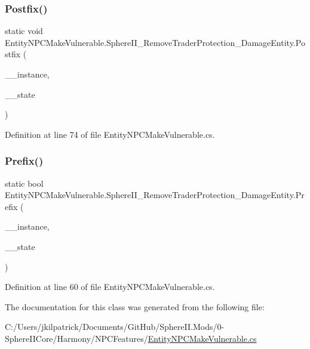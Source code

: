 \subsubsection{\texorpdfstring{Postfix()}{Postfix()}}
{\footnotesize\ttfamily static void Entity\+N\+P\+C\+Make\+Vulnerable.\+Sphere\+I\+I\+\_\+\+Remove\+Trader\+Protection\+\_\+\+Damage\+Entity.\+Postfix (\begin{DoxyParamCaption}\item[{Entity\+N\+PC}]{\+\_\+\+\_\+instance,  }\item[{int}]{\+\_\+\+\_\+state }\end{DoxyParamCaption})\hspace{0.3cm}{\ttfamily [static]}}



Definition at line 74 of file Entity\+N\+P\+C\+Make\+Vulnerable.\+cs.

\mbox{\label{class_entity_n_p_c_make_vulnerable_1_1_sphere_i_i___remove_trader_protection___damage_entity_a65a17f6017e445cb078bdb1e2e76a69b}} 
\subsubsection{\texorpdfstring{Prefix()}{Prefix()}}
{\footnotesize\ttfamily static bool Entity\+N\+P\+C\+Make\+Vulnerable.\+Sphere\+I\+I\+\_\+\+Remove\+Trader\+Protection\+\_\+\+Damage\+Entity.\+Prefix (\begin{DoxyParamCaption}\item[{Entity\+N\+PC}]{\+\_\+\+\_\+instance,  }\item[{int}]{\+\_\+\+\_\+state }\end{DoxyParamCaption})\hspace{0.3cm}{\ttfamily [static]}}



Definition at line 60 of file Entity\+N\+P\+C\+Make\+Vulnerable.\+cs.



The documentation for this class was generated from the following file\+:\begin{DoxyCompactItemize}
\item 
C\+:/\+Users/jkilpatrick/\+Documents/\+Git\+Hub/\+Sphere\+I\+I.\+Mods/0-\/\+Sphere\+I\+I\+Core/\+Harmony/\+N\+P\+C\+Features/\mbox{\hyperlink{_entity_n_p_c_make_vulnerable_8cs}{Entity\+N\+P\+C\+Make\+Vulnerable.\+cs}}\end{DoxyCompactItemize}
